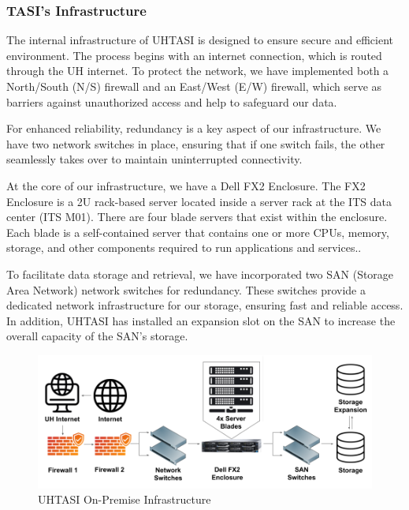 \subsubsection{TASI's Infrastructure}
\label{TASI's Infrastructure Section Header}

The internal infrastructure of UHTASI is designed to ensure secure and efficient environment. The process begins with an internet connection, which is routed through the UH internet. To protect the network, we have implemented both a North/South (N/S) firewall and an East/West (E/W) firewall, which serve as barriers against unauthorized access and help to safeguard our data.

For enhanced reliability, redundancy is a key aspect of our infrastructure. We have two network switches in place, ensuring that if one switch fails, the other seamlessly takes over to maintain uninterrupted connectivity.

At the core of our infrastructure, we have a Dell FX2 Enclosure. The FX2 Enclosure is a 2U rack-based server located inside a server rack at the ITS data center (ITS M01). There are four blade servers that exist within the enclosure. Each blade is a self-contained server that contains one or more CPUs, memory, storage, and other components required to run applications and services..

To facilitate data storage and retrieval, we have incorporated two SAN (Storage Area Network) network switches for redundancy. These switches provide a dedicated network infrastructure for our storage, ensuring fast and reliable access. In addition, UHTASI has installed an expansion slot on the SAN to increase the overall capacity of the SAN's storage. 

\begin{figure}[H]
    \centering
    \includegraphics[scale = 0.64]{images/UHTASI Infrastructure.png}
    \caption{UHTASI On-Premise Infrastructure}
    \label{UHTASI-INF}
\end{figure}

